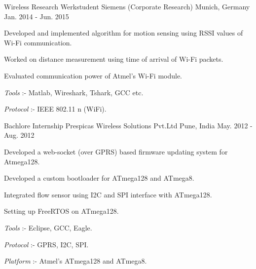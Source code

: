 \begin{cventries}
  \cventry
    {Wireless Research Werkstudent} %
    {Siemens (Corporate Research)} %
    {Munich, Germany} %
    {Jan. 2014 - Jun. 2015} %
    {
      \begin{cvitems} %
        \item {Developed and implemented algorithm for motion sensing using RSSI values of Wi-Fi communication.}
        \item {Worked on distance measurement using time of arrival of Wi-Fi packets.}
        \item {Evaluated communication power of Atmel's Wi-Fi module.}
        \item {\textit{Tools} :- Matlab, Wireshark, Tshark, GCC etc.}
        \item {\textit{Protocol} :- IEEE 802.11 n (WiFi).}
      \end{cvitems}
    }
\cventry
    {Bachlore Internship} %
    {Prespicas Wireless Solutions Pvt.Ltd} %
    {Pune, India} %
    {May. 2012 - Aug. 2012} %
    {
      \begin{cvitems} %
        \item {Developed a web-socket (over GPRS) based firmware updating system for Atmega128.}
        \item {Developed a custom bootloader for ATmega128 and ATmega8.}
        \item {Integrated flow sensor using I2C and SPI interface with ATmega128.}
        \item {Setting up FreeRTOS on ATmega128.}
        \item {\textit{Tools} :- Eclipse, GCC, Eagle.}
        \item {\textit{Protocol} :- GPRS, I2C, SPI.}
        \item {\textit{Platform} :- Atmel's ATmega128 and ATmega8.}
      \end{cvitems}
    }    
\end{cventries}
